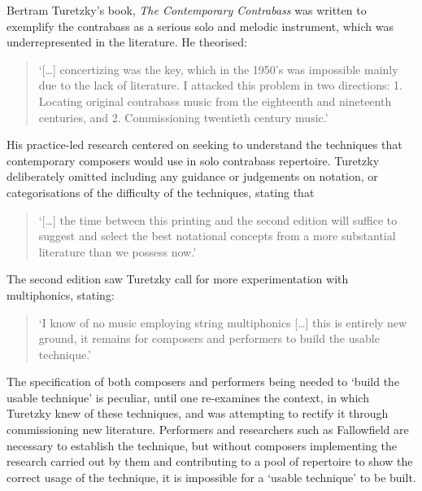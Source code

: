 Bertram Turetzky’s book, \emph{The Contemporary Contrabass} was written to exemplify the contrabass as a serious solo and melodic instrument, which was underrepresented in the literature.\autocite[]{turetzkyContemporaryContrabass1974} He theorised: 
\begin{quote}
    ‘[…] concertizing was the key, which in the 1950’s was impossible mainly due to the lack of literature. I attacked this problem in two directions: 1. Locating original contrabass music from the eighteenth and nineteenth centuries, and 2. Commissioning twentieth century music.’\autocite[vii]{turetzkyContemporaryContrabass1974}
\end{quote}
His practice-led research centered on seeking to understand the techniques that contemporary composers would use in solo contrabass repertoire. 
Turetzky deliberately omitted including any guidance or judgements on notation, or categorisations of the difficulty of the techniques, stating that \begin{quote}
    ‘[…] the time between this printing and the second edition will suffice to suggest and select the best notational concepts from a more substantial literature than we possess now.’\autocite[ix]{turetzkyContemporaryContrabass1974} 
\end{quote}The second edition saw Turetzky call for more experimentation with multiphonics, stating:
\begin{quote}
    ‘I know of no music employing string multiphonics […] this is entirely new ground, it remains for composers and performers to build the usable technique.’\autocite[138]{turetzkyContemporaryContrabass1992}
\end{quote}
The specification of both composers and performers being needed to ‘build the usable technique’ is peculiar, until one re-examines the context, in which Turetzky knew of these techniques, and was attempting to rectify it through commissioning new literature. 
Performers and researchers such as Fallowfield are necessary to establish the technique, but without composers implementing the research carried out by them and contributing to a pool of repertoire to show the correct usage of the technique, it is impossible for a ‘usable technique’ to be built.

